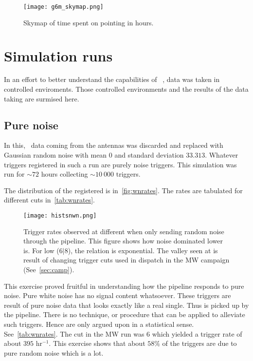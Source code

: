 \begin{figure}
	\centering
	\label{fig:skymap}
	\texttt{[image: g6m\_skymap.png]}
	\caption{Skymap of time spent on pointing in hours.}
\end{figure}


\section{Simulation runs}
\label{sec:sim}

\par In an effort to better understand the capabilities of \vf~, data was taken in controlled enviroments.
Those controlled environments and the results of the data taking are surmised here.

\subsection{Pure noise}
\par In this, \vf~data coming from the antennas was discarded and replaced with Gaussian random noise 
with mean $0$ and standard deviation $33.313$. 
Whatever triggers registered in such a run are purely noise triggers.
This simulation was run for $\sim 72$ hours collecting $\sim 10\ 000$ triggers.

\par The distribution of the \sn registered is in~\autoref{fig:wnrates}. The rates are tabulated for different \sn cuts in~\autoref{tab:wnrates}.

\begin{figure}
	\label{fig:wnrates}
	\texttt{[image: histsnwn.png]}
	\caption{Trigger rates observed at different \sn when only sending random noise through the pipeline.
		This figure shows how noise dominated lower \sn is. For low \sn ($6|8$), the relation is exponential.
		The valley seen at  is result of changing trigger cuts used in dispatch in the MW campaign (See~\autoref{sec:camp}).
	}
\end{figure}

\par This exercise proved fruitful in understanding how the pipeline responds to pure noise.
Pure white noise has no signal content whatsoever. These triggers are result of pure noise data that looks exactly like a real single.
Thus is picked up by the pipeline. There is no technique, or procedure that can be applied to alleviate such triggers.
Hence are only argued upon in a statistical sense. See~\autoref{tab:wnrates}. 
The \sn cut in the MW run was $6$ which yielded a trigger rate of about $395$ hr$^{-1}$. 
This exercise shows that about $58\%$ of the triggers are due to pure random noise which is a lot.

